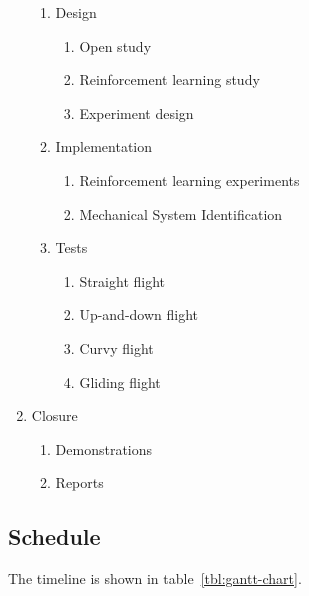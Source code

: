 \documentclass[a4paper, 10pt, twocolumn, titlepage]{article}
\begin{document}
\begin{enumerate}
\begin{enumerate}
    \itemsep-0.5mm
      \item Design \label{wbs:ctrl_design}
        \begin{enumerate}
        \itemsep-0.5mm
          \item Open study
          \item Reinforcement learning study
          \item Experiment design
        \end{enumerate}
      \item Implementation \label{wbs:ctrl_impl}
        \begin{enumerate}
        \itemsep-0.5mm
          \item Reinforcement learning experiments
          \item Mechanical System Identification
        \end{enumerate}
      \item Tests \label{wbs:ctrl_test}
        \begin{enumerate}
        \itemsep-0.5mm 
          \item Straight flight
          \item Up-and-down flight 
          \item Curvy flight
          \item Gliding flight
        \end{enumerate}
    \end{enumerate}
  \item Closure
    \begin{enumerate}
    \itemsep-0.5mm
      \item Demonstrations  \label{wbs:demo}
      \item Reports  \label{wbs:rpt}
    \end{enumerate}
\end{enumerate}

\subsection{Schedule}
The timeline is shown in table~\ref{tbl:gantt-chart}.
\end{document}
